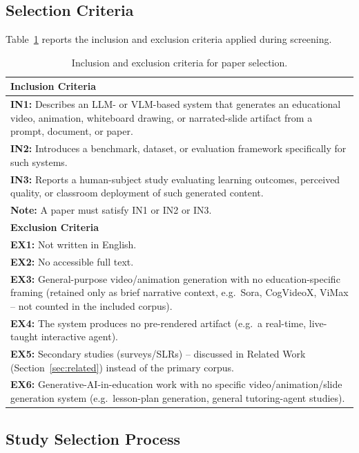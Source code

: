 \documentclass[journal]{IEEEtran}
\begin{document}
\subsection{Selection Criteria}

Table~\ref{tab:selection-criteria} reports the inclusion and exclusion criteria applied during screening.

\begin{table}[t]
\caption{Inclusion and exclusion criteria for paper selection.}
\label{tab:selection-criteria}
\centering
\begin{tabular}{p{8.2cm}}
\hline
\textbf{Inclusion Criteria} \\
\hline
\textbf{IN1:} Describes an LLM- or VLM-based system that generates an educational video, animation, whiteboard drawing, or narrated-slide artifact from a prompt, document, or paper. \\
\textbf{IN2:} Introduces a benchmark, dataset, or evaluation framework specifically for such systems. \\
\textbf{IN3:} Reports a human-subject study evaluating learning outcomes, perceived quality, or classroom deployment of such generated content. \\
\textbf{Note:} A paper must satisfy IN1 or IN2 or IN3. \\
\hline
\textbf{Exclusion Criteria} \\
\hline
\textbf{EX1:} Not written in English. \\
\textbf{EX2:} No accessible full text. \\
\textbf{EX3:} General-purpose video/animation generation with no education-specific framing (retained only as brief narrative context, e.g.\ Sora, CogVideoX, ViMax -- not counted in the included corpus). \\
\textbf{EX4:} The system produces no pre-rendered artifact (e.g.\ a real-time, live-taught interactive agent). \\
\textbf{EX5:} Secondary studies (surveys/SLRs) -- discussed in Related Work (Section~\ref{sec:related}) instead of the primary corpus. \\
\textbf{EX6:} Generative-AI-in-education work with no specific video/animation/slide generation system (e.g.\ lesson-plan generation, general tutoring-agent studies). \\
\hline
\end{tabular}
\end{table}

\subsection{Study Selection Process}
\end{document}
